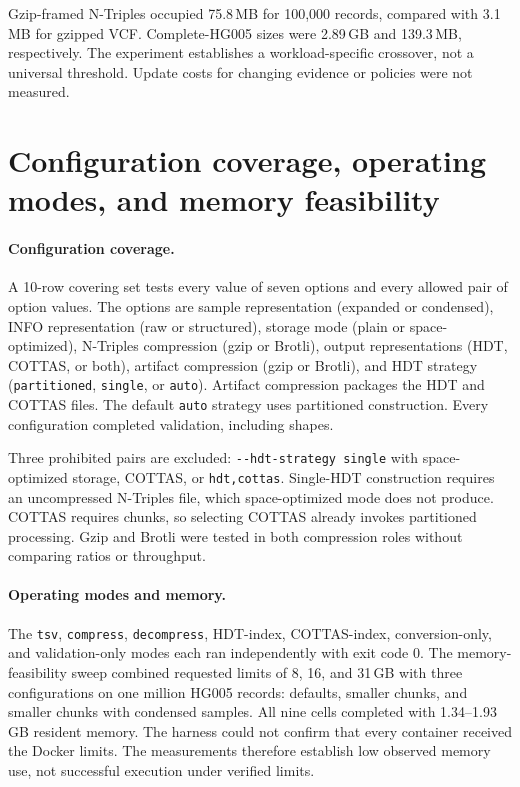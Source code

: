 \documentclass[11pt]{article}
\begin{document}
Gzip-framed N-Triples occupied 75.8\,MB for 100,000 records, compared with 3.1\,MB for gzipped VCF.
Complete-HG005 sizes were 2.89\,GB and 139.3\,MB, respectively.
The experiment establishes a workload-specific crossover, not a universal threshold.
Update costs for changing evidence or policies were not measured.

\section{Configuration coverage, operating modes, and memory feasibility}\label{sec:config}
\paragraph{Configuration coverage.}
A 10-row covering set tests every value of seven options and every allowed pair of option values.
The options are sample representation (expanded or condensed), INFO representation (raw or structured), storage mode (plain or space-optimized), N-Triples compression (gzip or Brotli), output representations (HDT, COTTAS, or both), artifact compression (gzip or Brotli), and HDT strategy (\texttt{partitioned}, \texttt{single}, or \texttt{auto}).
Artifact compression packages the HDT and COTTAS files.
The default \texttt{auto} strategy uses partitioned construction.
Every configuration completed validation, including shapes.

Three prohibited pairs are excluded: \texttt{-{}-hdt-strategy single} with space-optimized storage, COTTAS, or \texttt{hdt,cottas}.
Single-HDT construction requires an uncompressed N-Triples file, which space-optimized mode does not produce.
COTTAS requires chunks, so selecting COTTAS already invokes partitioned processing.
Gzip and Brotli were tested in both compression roles without comparing ratios or throughput.

\paragraph{Operating modes and memory.}
The \texttt{tsv}, \texttt{compress}, \texttt{decompress}, HDT-index, COTTAS-index, conversion-only, and validation-only modes each ran independently with exit code 0.
The memory-feasibility sweep combined requested limits of 8, 16, and 31\,GB with three configurations on one million HG005 records: defaults, smaller chunks, and smaller chunks with condensed samples.
All nine cells completed with 1.34--1.93\,GB resident memory.
The harness could not confirm that every container received the Docker limits.
The measurements therefore establish low observed memory use, not successful execution under verified limits.
\end{document}
